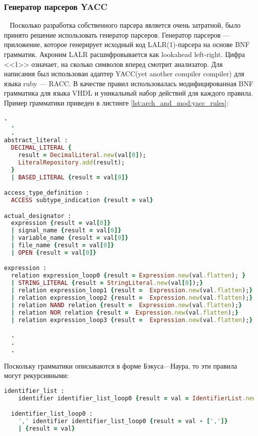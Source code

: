 \subsubsection{Генератор парсеров YACC}~
\label{sub:arch_and_mod:parser_generator}
Посколько разработка собственного парсера является очень затратной, было принято решение использовать генератор парсеров. Генератор парсеров --- приложение, которое генерирует исходный код LALR(1)-парсера на основе BNF грамматик. Акроним LALR расшифровывается как lookahead left-right. Цифра <<1>> означает, на сколько символов вперед смотрит анализатор. Для написания был использован адаптер YACC(yet another compiler compiler) для языка ruby --- RACC. В качестве правил использовалась модифицированная BNF грамматика для языка VHDL и уникальный набор действий для каждого правила. Пример грамматики приведен в листинге \ref{lst:arch_and_mod:yacc_rules}:
\begin{lstlisting}[language=Ruby, style=rubystyle,caption={Различные описания грамматик и действия, вызываемые при соответствии грамматики линейной последовательности}, label=lst:arch_and_mod:yacc_rules]
  .
  .
  .
abstract_literal :
  DECIMAL_LITERAL {
    result = DecimalLiteral.new(val[0]);
    LiteralRepository.add(result);
  }
  | BASED_LITERAL {result = val[0]}

access_type_definition :
  ACCESS subtype_indication {result = val}

actual_designator :
  expression {result = val[0]}
  | signal_name {result = val[0]}
  | variable_name {result = val[0]}
  | file_name {result = val[0]}
  | OPEN {result = val[0]}

expression :
  relation expression_loop0 {result = Expression.new(val.flatten); }
  | STRING_LITERAL {result = StringLiteral.new(val[0]);}
  | relation expression_loop1 {result =  Expression.new(val.flatten);}
  | relation expression_loop2 {result =  Expression.new(val.flatten);}
  | relation NAND relation {result =  Expression.new(val.flatten);}
  | relation NOR relation {result =  Expression.new(val.flatten);}
  | relation expression_loop3 {result =  Expression.new(val.flatten);}

  .
  .
  .
\end{lstlisting}
Поскольку грамматики описываются в форме Бэкуса---Наура, то эти правила могут рекурсивными:


\begin{lstlisting}[language=Ruby, style=rubystyle,caption={Пример рекурсивных правил}, label=lst:arch_and_mod:recursive_rules]
  identifier_list :
    identifier identifier_list_loop0 {result = val = IdentifierList.new(val.flatten); InitializeRepository.add(result.identifiers) }

  identifier_list_loop0 :
    ',' identifier identifier_list_loop0 {result = val - [',']}
    | {result = val}
\end{lstlisting}


